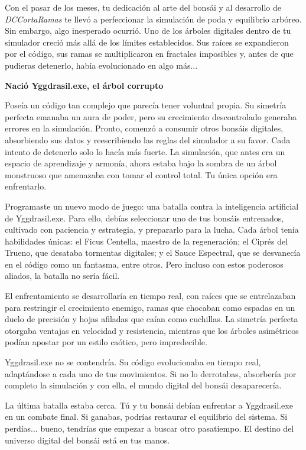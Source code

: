 \label{sec:introduccion}

Con el pasar de los meses, tu dedicaci\'on al arte del bons\'ai y al desarrollo de \textit{DCCortaRamas} te llev\'o a perfeccionar la simulaci\'on de poda y equilibrio arb\'oreo. Sin embargo, algo inesperado ocurri\'o. Uno de los \'arboles digitales dentro de tu simulador creci\'o m\'as all\'a de los l\'imites establecidos. Sus ra\'ices se expandieron por el c\'odigo, sus ramas se multiplicaron en fractales imposibles y, antes de que pudieras detenerlo, hab\'ia evolucionado en algo m\'as...


\begin{center}
\textbf{Naci\'o Yggdrasil.exe, el \'arbol corrupto}
\end{center}

Pose\'ia un c\'odigo tan complejo que parec\'ia tener voluntad propia. Su simetr\'ia perfecta emanaba un aura de poder, pero su crecimiento descontrolado generaba errores en la simulaci\'on. Pronto, comenz\'o a consumir otros bons\'ais digitales, absorbiendo sus datos y reescribiendo las reglas del simulador a su favor. Cada intento de detenerlo solo lo hac\'ia m\'as fuerte. La simulaci\'on, que antes era un espacio de aprendizaje y armon\'ia, ahora estaba bajo la sombra de un \'arbol monstruoso que amenazaba con tomar el control total. Tu \'unica opci\'on era enfrentarlo.

Programaste un nuevo modo de juego: una batalla contra la inteligencia artificial de Yggdrasil.exe. Para ello, deb\'ias seleccionar uno de tus bons\'ais entrenados, cultivado con paciencia y estrategia, y prepararlo para la lucha. Cada \'arbol ten\'ia habilidades \'unicas: el Ficus Centella, maestro de la regeneraci\'on; el Cipr\'es del Trueno, que desataba tormentas digitales; y el Sauce Espectral, que se desvanec\'ia en el c\'odigo como un fantasma, entre otros. Pero incluso con estos poderosos aliados, la batalla no ser\'ia f\'acil.

El enfrentamiento se desarrollar\'ia en tiempo real, con ra\'ices que se entrelazaban para restringir el crecimiento enemigo, ramas que chocaban como espadas en un duelo de precisi\'on y hojas afiladas que ca\'ian como cuchillas. La simetr\'ia perfecta otorgaba ventajas en velocidad y resistencia, mientras que los \'arboles asim\'etricos pod\'ian apostar por un estilo ca\'otico, pero impredecible.

Yggdrasil.exe no se contendr\'ia. Su c\'odigo evolucionaba en tiempo real, adapt\'andose a cada uno de tus movimientos. Si no lo derrotabas, absorber\'ia por completo la simulaci\'on y con ella, el mundo digital del bons\'ai desaparecer\'ia.

La \'ultima batalla estaba cerca. T\'u y tu bons\'ai deb\'ian enfrentar a Yggdrasil.exe en un combate final. Si ganabas, podr\'ias restaurar el equilibrio del sistema. Si perd\'ias... bueno, tendr\'ias que empezar a buscar otro pasatiempo. El destino del universo digital del bons\'ai est\'a en tus manos.